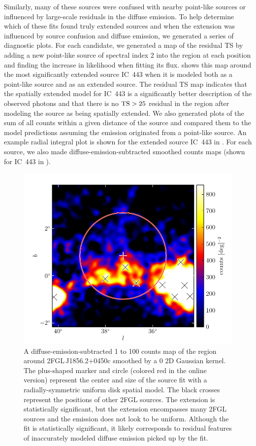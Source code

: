 Similarly, many of these sources were confused with nearby point-like
sources or influenced by large-scale residuals in the diffuse emission.
To help determine which of these fits found truly extended sources
and when the extension was influenced by source confusion and diffuse
emission, we generated a series of diagnostic plots.  For each candidate,
we generated a map of the residual TS by adding a new point-like source
of spectral index 2 into the region at each position and finding the
increase in likelihood when fitting its flux.  shows
this map around the most significantly extended source IC~443 when
it is modeled both as a point-like source and as an extended source.
The residual TS map indicates that the spatially extended model for
IC~443 is a significantly better description of the observed photons
and that there is no $\mathrm{TS}>25$ residual in the region after modeling the
source as being spatially extended.  We also generated plots of the
sum of all counts within a given distance of the source and compared
them to the model predictions assuming the emission originated from a
point-like source.  An example radial integral plot is shown for the
extended source IC~443 in .  For each source,
we also made diffuse-emission-subtracted smoothed counts maps (shown
for IC~443 in ).

\begin{figure}[htbp]
    \includegraphics{source_plots/example_bad_fit_color.pdf}
    \caption{A diffuse-emission-subtracted 1 \gev to 100 \gev counts
    map of the region around 2FGL\,J1856.2+0450c smoothed by a 0
    2D Gaussian kernel. The plus-shaped marker and circle (colored
    red in the online version) represent the center and size of the
    source fit with a radially-symmetric uniform disk spatial model.
    The black crosses represent the positions of other 2FGL sources.
    The extension is statistically significant, but the extension
    encompasses many 2FGL sources and the emission does not look to be
    uniform. Although the fit is statistically significant, it likely
    corresponds to residual features of inaccurately modeled diffuse
    emission picked up by the fit.}
\end{figure}

